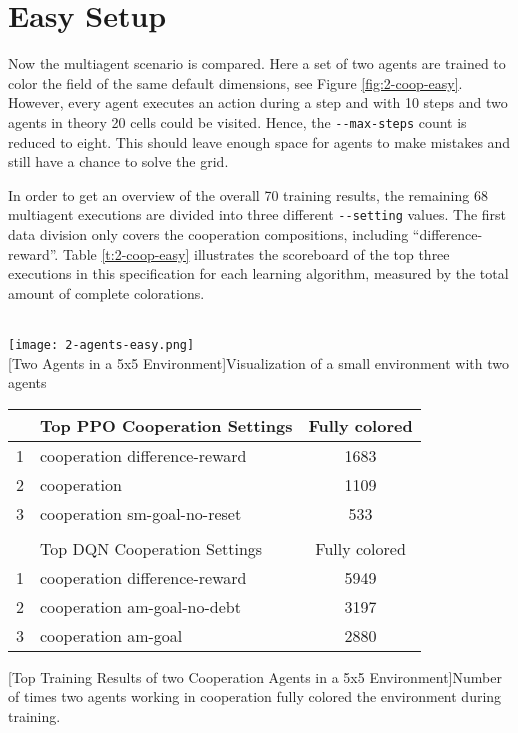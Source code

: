\section{Easy Setup} \label{easy_env}

Now the multiagent scenario is compared. Here a set of two agents are trained to color the field of the same default dimensions, see Figure \ref{fig:2-coop-easy}. However, every agent executes an action during a step and with 10 steps and two agents in theory 20 cells could be visited. Hence, the \verb|--max-steps| count is reduced to eight. This should leave enough space for agents to make mistakes and still have a chance to solve the grid.

In order to get an overview of the overall 70 training results, the remaining 68 multiagent executions are divided into three different \verb|--setting| values. The first data division only covers the cooperation compositions, including ``difference-reward''. Table \ref{t:2-coop-easy} illustrates the scoreboard of the top three executions in this specification for each learning algorithm, measured by the total amount of complete colorations. \\\\

\begin{minipage}{\textwidth}
  \begin{minipage}[b]{0.29\textwidth}
    \centering
    \texttt{[image: 2-agents-easy.png]}\\
    [Two Agents in a 5x5 Environment]{Visualization of a small environment with two agents}\label{fig:2-coop-easy}
  \end{minipage}
  \hfill
    \begin{minipage}[b]{0.69\textwidth}
    \centering
    \begin{tabular}{clc}\hline
         & Top PPO Cooperation Settings & Fully colored \\ \hline
        {\small 1} & cooperation difference-reward & 1683 \\
        {\small 2} & cooperation & 1109 \\
        {\small 3} & cooperation sm-goal-no-reset & 533 \\ \hline
         &   \\ \hline
         & Top DQN Cooperation Settings & Fully colored \\ \hline
        {\small 1} & cooperation difference-reward & 5949 \\
        {\small 2} & cooperation am-goal-no-debt & 3197 \\
        {\small 3} & cooperation am-goal & 2880 \\ \hline
        \end{tabular}
        [Top Training Results of two Cooperation Agents in a 5x5 Environment]{Number of times two agents working in cooperation fully colored the environment during training.\\}\label{t:2-coop-easy}
    \end{minipage}
  \end{minipage}\\\\

